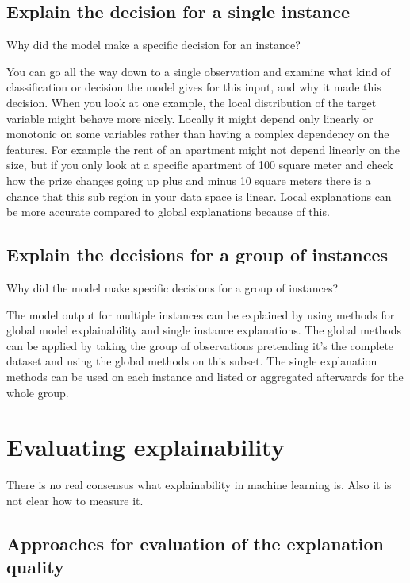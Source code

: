 \documentclass[12pt,]{krantz}
\theoremstyle{definition}
\theoremstyle{definition}
\theoremstyle{definition}
\theoremstyle{remark}
\begin{document}
\subsection{Explain the decision for a single
instance}\label{explain-the-decision-for-a-single-instance}

Why did the model make a specific decision for an instance?

You can go all the way down to a single observation and examine what
kind of classification or decision the model gives for this input, and
why it made this decision. When you look at one example, the local
distribution of the target variable might behave more nicely. Locally it
might depend only linearly or monotonic on some variables rather than
having a complex dependency on the features. For example the rent of an
apartment might not depend linearly on the size, but if you only look at
a specific apartment of 100 square meter and check how the prize changes
going up plus and minus 10 square meters there is a chance that this sub
region in your data space is linear. Local explanations can be more
accurate compared to global explanations because of this.

\subsection{Explain the decisions for a group of
instances}\label{explain-the-decisions-for-a-group-of-instances}

Why did the model make specific decisions for a group of instances?

The model output for multiple instances can be explained by using
methods for global model explainability and single instance
explanations. The global methods can be applied by taking the group of
observations pretending it's the complete dataset and using the global
methods on this subset. The single explanation methods can be used on
each instance and listed or aggregated afterwards for the whole group.

\section{Evaluating explainability}\label{evaluating-explainability}

There is no real consensus what explainability in machine learning is.
Also it is not clear how to measure it.

\subsection{Approaches for evaluation of the explanation
quality}\label{approaches-for-evaluation-of-the-explanation-quality}
\end{document}
